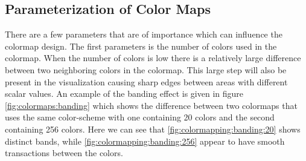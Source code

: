 \subsection{Parameterization of Color Maps}
\label{ss:colormaps:parameterization}
There are a few parameters that are of importance which can influence the colormap design. The first parameters is the number of colors used in the colormap. When the number of colors is low there is a relatively large difference between two neighboring colors in the colormap. This large step will also be present in the visualization causing sharp edges between areas with different scalar values. An example of the banding effect is given in figure \ref{fig:colormaps:banding} which shows the difference between two colormaps that uses the same color-scheme with one containing 20 colors and the second containing 256 colors. Here we can see that \cref{fig:colormapping:banding:20} shows distinct bands, while \cref{fig:colormapping:banding:256} appear to have smooth transactions between the colors.
